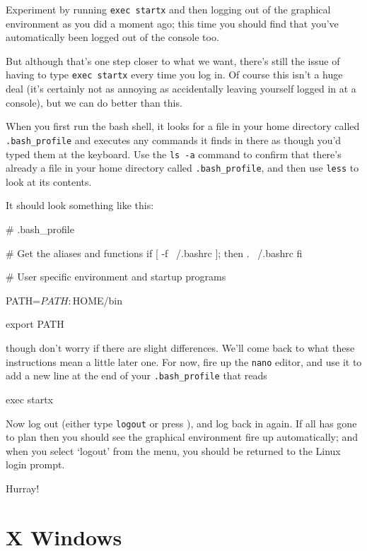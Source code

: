 Experiment by running \texttt{exec startx} and then logging out of the graphical environment as you did a moment ago; this time you should find that you've automatically been logged out of the console too.

But although that's one step closer to what we want, there's still the issue of having to type \texttt{exec startx} every time you log in. Of course this isn't a huge deal (it's certainly not as annoying as accidentally leaving yourself logged in at a console), but we can do better than this. 

When you first run the bash shell, it looks for a file in your home directory called \texttt{.bash\_profile} and executes any commands it finds in there as though you'd typed them at the keyboard. Use the \texttt{ls -a} command to confirm that there's already a file in your home directory called \texttt{.bash\_profile}, and then use \texttt{less} to look at its contents.

It should look something like this:

\begin{ttoutenv}
# .bash_profile

# Get the aliases and functions
if [ -f ~/.bashrc ]; then
	. ~/.bashrc
fi

# User specific environment and startup programs

PATH=$PATH:$HOME/bin

export PATH
\end{ttoutenv}

though don't worry if there are slight differences. We'll come back to what these instructions mean a little later one. For now, fire up the \texttt{nano} editor, and use it to add a new line at the end of your \texttt{.bash\_profile} that reads 

\begin{ttoutenv}
exec startx
\end{ttoutenv}

Now log out (either type \texttt{logout} or press ), and log back in again. If all has gone to plan then you should see the graphical environment fire up automatically; and when you select `logout' from the menu, you should be returned to the Linux login prompt. 

Hurray!

\section{X Windows}

